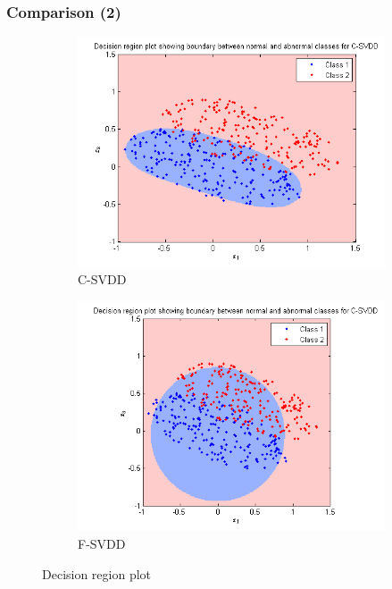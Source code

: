 \documentclass{beamer}
\begin{document}
\begin{frame}
\frametitle{Comparison (2)}

\begin{figure}[H]
\begin{subfigure}{.5\textwidth}
  \centering
  \includegraphics[width=\linewidth]{decn1}
\caption{C-SVDD} 
\end{subfigure}%
\begin{subfigure}{.5\textwidth}
  \centering
  \includegraphics[width=\linewidth]{decn2}
\caption{F-SVDD} 
\end{subfigure}
\caption{Decision region plot} 
\end{figure}


\end{frame}
\end{document}
